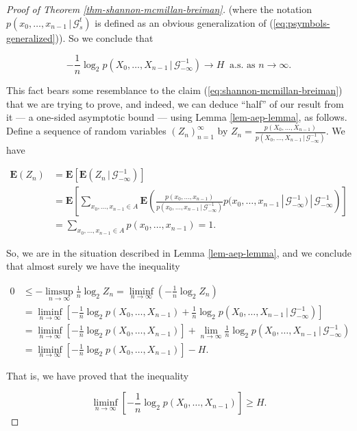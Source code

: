 \documentclass[11pt]{report}
\theoremstyle{plain}
\theoremstyle{definition}
\begin{document}
\begin{proof}[Proof of Theorem \ref{thm-shannon-mcmillan-breiman}]
(where the notation $p(x_0,\ldots,x_{n-1}\,|\,\mathcal{G}_s^t)$ is defined as an obvious generalization of (\ref{eq:psymbols-generalized})). So we conclude that

\[
-\frac{1}{n} \log_2 p(X_0,\ldots,X_{n-1}\,|\,\mathcal{G}_{-\infty}^{-1})
\to H \ \textrm{ a.s. as }n\to\infty.
\]

This fact bears some resemblance to the claim (\ref{eq:shannon-mcmillan-breiman}) that we are trying to prove, and indeed, we can deduce ``half'' of our result from it --- a one-sided asymptotic bound --- using Lemma \ref{lem-aep-lemma}, as follows. Define a sequence of random variables $(Z_n)_{n=1}^\infty$ by $Z_n = \frac{p(X_0,\ldots,X_{n-1})}{p(X_0,\ldots,X_{n-1}\,|\,\mathcal{G}_{-\infty}^{-1})}$. We have

\begin{align*}
\mathbf{E}(Z_n) &= \mathbf{E} \left[\mathbf{E}\left(Z_n\,|\,\mathcal{G}_{-\infty}^{-1}\right)\right] \\
&= \mathbf{E}\left[
\sum_{x_0,\ldots,x_{n-1}\in A}
\mathbf{E}\left(
\frac{p(x_0,\ldots,x_{n-1})}{p(x_0,\ldots,x_{n-1}\,|\,\mathcal{G}_{-\infty}^{-1})}
p(x_0,\ldots,x_{n-1}\,|\,\mathcal{G}_{-\infty}^{-1})
\,|\,\mathcal{G}_{-\infty}^{-1}\right)
\right] \\
&= \tag{39}\label{eq:aep-expec1} \sum_{x_0,\ldots,x_{n-1}\in A} p(x_0,\ldots,x_{n-1}) = 1.
\end{align*}

So, we are in the situation described in Lemma \ref{lem-aep-lemma}, and we conclude that almost surely we have the inequality

\begin{align*}
0 &\le -\limsup_{n\to\infty} \frac{1}{n} \log_2 Z_n = \liminf_{n\to\infty} \left(-\frac{1}{n} \log_2 Z_n\right) \\
&= \liminf_{n\to\infty} \left[
-\frac{1}{n} \log_2 p(X_0,\ldots,X_{n-1}) + \frac{1}{n}\log_2 p(X_0,\ldots,X_{n-1}\,|\,\mathcal{G}_{-\infty}^{-1}) \right] \\
&=
\liminf_{n\to\infty} \left[-\frac{1}{n} \log_2 p(X_0,\ldots,X_{n-1})\right] +
\lim_{n\to\infty}
\frac{1}{n}\log_2 p(X_0,\ldots,X_{n-1}\,|\,\mathcal{G}_{-\infty}^{-1}) \\
&=
\liminf_{n\to\infty} \left[-\frac{1}{n} \log_2 p(X_0,\ldots,X_{n-1})\right] - H.
\end{align*}

That is, we have proved that the inequality

\begin{equation*} \tag{40}\label{eq:smb-first-half}
\liminf_{n\to\infty} \left[-\frac{1}{n} \log_2 p(X_0,\ldots,X_{n-1})\right] \ge H.
\end{equation*}


\end{proof}
\end{document}
